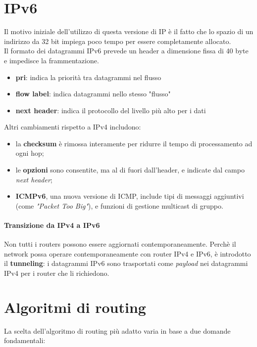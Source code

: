 \section{IPv6}
Il motivo iniziale dell'utilizzo di questa versione di IP è il fatto che lo spazio di un indirizzo da 32 bit impiega poco tempo per essere completamente allocato. \\
Il formato dei datagrammi IPv6 prevede un header a dimensione fissa di 40 byte e impedisce la frammentazione.
\begin{itemize}
	\item \textbf{pri}: indica la priorità tra datagrammi nel flusso
	\item \textbf{flow label}: indica datagrammi nello stesso "flusso"
	\item \textbf{next header}: indica il protocollo del livello più alto per i dati%
\end{itemize}
Altri cambiamenti rispetto a IPv4 includono:
\begin{itemize}
	\item la \textbf{checksum} è rimossa interamente per ridurre il tempo di processamento ad ogni hop;
	\item le \textbf{opzioni} sono consentite, ma al di fuori dall'header, e indicate dal campo \textit{next header};
	\item \textbf{ICMPv6}, una nuova versione di ICMP, include tipi di messaggi aggiuntivi (come \textit{"Packet Too Big"}), e funzioni di gestione multicast di gruppo.
\end{itemize}

\paragraph{Transizione da IPv4 a IPv6}
Non tutti i routers possono essere aggiornati contemporaneamente. Perchè il network possa operare contemporaneamente con router IPv4 e IPv6, è introdotto il \textbf{tunneling}: i datagrammi IPv6 sono trasportati come \textit{payload} nei datagrammi IPv4 per i router che li richiedono.
\section{Algoritmi di routing}
La scelta dell'algoritmo di routing più adatto varia in base a due domande fondamentali:

